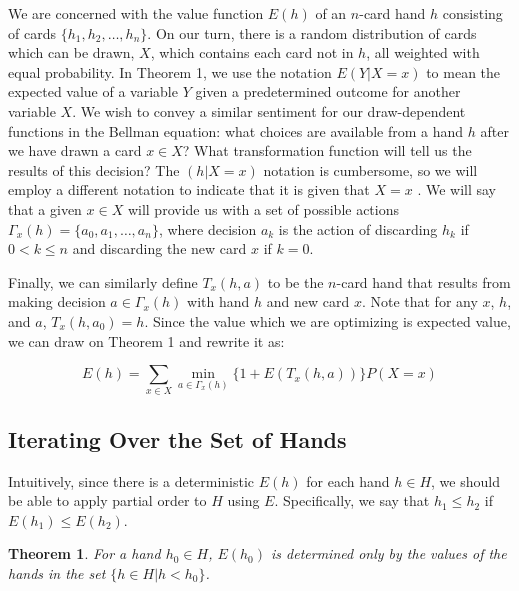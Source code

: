 \documentclass[letter,12pt]{article}
\newtheorem{theorem}{Theorem}
\begin{document}
We are concerned with the value function $E(h)$ of an $n$-card hand $h$ consisting of cards $\{h_1,h_2,\ldots,h_n\}$. On our turn, there is a random distribution of cards which can be drawn, $X$, which contains each card not in $h$, all weighted with equal probability. In Theorem 1, we use the notation $E(Y | X = x)$ to mean the expected value of a variable $Y$ given a predetermined outcome for another variable $X$. We wish to convey a similar sentiment for our draw-dependent functions in the Bellman equation: what choices are available from a hand $h$ after we have drawn a card $x \in X$? What transformation function will tell us the results of this decision? The $(h | X=x )$ notation is cumbersome, so we will employ a different notation to indicate that it is given that $X=x$ . We will say that a given $x \in X$  will provide us with a set of possible actions $\Gamma_x (h) = \{a_0,a_1,\ldots,a_n\}$, where decision $a_k$ is the action of discarding $h_k$ if $0 < k \leq n$  and discarding the new card $x$ if $k=0$.

Finally, we can similarly define $T_x(h,a)$ to be the $n$-card hand that results from making decision $a \in \Gamma_x(h)$ with hand $h$ and new card $x$. Note that for any $x$, $h$, and $a$, $T_x(h,a_0)=h$. Since the value which we are optimizing is expected value, we can draw on Theorem 1 and rewrite it as: 

$$E(h) = \sum_{x \in X} \min_{a \in \Gamma_x (h)} \{1 + E(T_x(h,a))\} P(X = x)$$

\subsection{Iterating Over the Set of Hands}

Intuitively, since there is a deterministic $E(h)$ for each hand $h \in H$, we should be able to apply partial order to $H$ using $E$. Specifically, we say that $h_1 \leq h_2$ if $E(h_1) \leq E(h_2)$.

\begin{theorem}
For a hand $h_0 \in H$, $E(h_0)$ is determined only by the values of the hands in the set $\{h \in H | h < h_0\}$.
\end{theorem}
\end{document}
